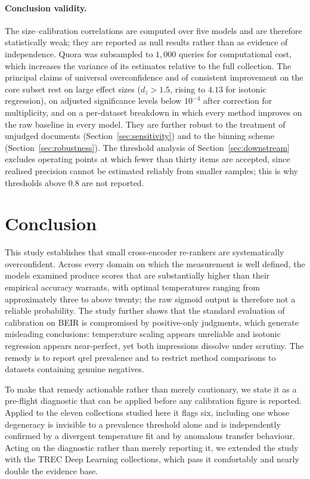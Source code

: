 \documentclass[sn-mathphys-num,pdflatex]{sn-jnl}
\begin{document}
\paragraph{Conclusion validity.}
The size--calibration correlations are computed over five models and are therefore
statistically weak; they are reported as null results rather than as evidence of
independence. Quora was subsampled to $1{,}000$ queries for computational cost,
which increases the variance of its estimates relative to the full collection. The
principal claims of universal overconfidence and of consistent improvement on the
core subset rest on large effect sizes ($d_z > 1.5$, rising to $4.13$ for isotonic
regression), on adjusted significance levels below $10^{-4}$ after correction for
multiplicity, and on a per-dataset breakdown in which every method improves on the
raw baseline in every model. They are further robust to the treatment of unjudged
documents (Section~\ref{sec:sensitivity}) and to the binning scheme
(Section~\ref{sec:robustness}). The threshold analysis of
Section~\ref{sec:downstream} excludes operating points at which fewer than thirty
items are accepted, since realised precision cannot be estimated reliably from
smaller samples; this is why thresholds above $0.8$ are not reported.

\section{Conclusion}\label{sec:conclusion}

This study establishes that small cross-encoder re-rankers are systematically
overconfident. Across every domain on which the measurement is well defined, the
models examined produce scores that are substantially higher than their empirical
accuracy warrants, with optimal temperatures ranging from approximately three to
above twenty; the raw sigmoid output is therefore not a reliable probability. The
study further shows that the standard evaluation of calibration on BEIR is
compromised by positive-only judgments, which generate misleading conclusions:
temperature scaling appears unreliable and isotonic regression appears
near-perfect, yet both impressions dissolve under scrutiny. The remedy is to
report qrel prevalence and to restrict method comparisons to datasets containing
genuine negatives.

To make that remedy actionable rather than merely cautionary, we state it as a
pre-flight diagnostic that can be applied before any calibration figure is reported.
Applied to the eleven collections studied here it flags six, including one whose
degeneracy is invisible to a prevalence threshold alone and is independently
confirmed by a divergent temperature fit and by anomalous transfer behaviour. Acting
on the diagnostic rather than merely reporting it, we extended the study with the
TREC Deep Learning collections, which pass it comfortably and nearly double the
evidence base.
\end{document}
